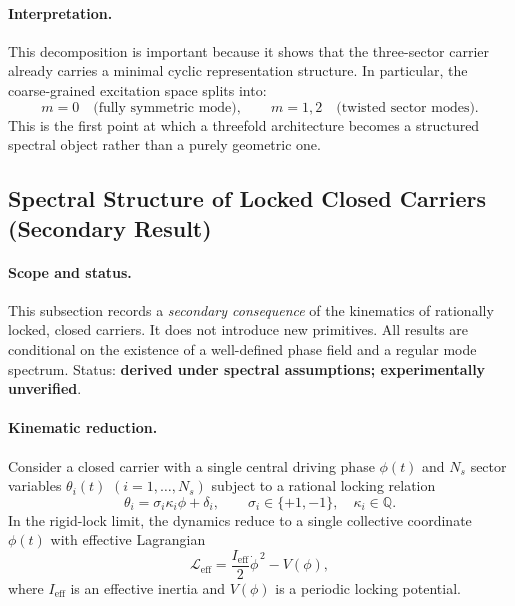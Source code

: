 \documentclass[11pt]{article}
\begin{document}
        \paragraph{Interpretation.}
            This decomposition is important because it shows that the three-sector carrier already carries a minimal cyclic representation structure. In particular, the coarse-grained excitation space splits into:
            \begin{equation}
                m=0
                \quad \text{(fully symmetric mode)},
                \qquad
                m=1,2
                \quad \text{(twisted sector modes)}.
            \end{equation}
            This is the first point at which a threefold architecture becomes a structured spectral object rather than a purely geometric one.
            
            
    \subsection{Spectral Structure of Locked Closed Carriers (Secondary Result)}
    \label{subsec:spectral_locked_carriers}
    
    \paragraph{Scope and status.}
        This subsection records a \emph{secondary consequence} of the kinematics of rationally locked, closed carriers. It does not introduce new primitives. All results are conditional on the existence of a well-defined phase field and a regular mode spectrum. Status: \textbf{derived under spectral assumptions; experimentally unverified}.

    \paragraph{Kinematic reduction.}
        Consider a closed carrier with a single central driving phase $\phi(t)$ and $N_s$ sector variables $\theta_i(t)$ $(i=1,\dots,N_s)$ subject to a rational locking relation
        \begin{equation}
            \theta_i = \sigma_i \kappa_i \phi + \delta_i,
            \qquad
            \sigma_i \in \{+1,-1\},\quad \kappa_i \in \mathbb{Q}.
            \label{eq:locking_relation}
        \end{equation}
        In the rigid-lock limit, the dynamics reduce to a single collective coordinate $\phi(t)$ with effective Lagrangian
        \begin{equation}
            \mathcal{L}_{\mathrm{eff}}
            =
            \frac{I_{\mathrm{eff}}}{2}\dot{\phi}^{\,2}
            -
            V(\phi),
            \label{eq:Leff_canonical}
        \end{equation}
        where $I_{\mathrm{eff}}$ is an effective inertia and $V(\phi)$ is a periodic locking potential.
\end{document}
